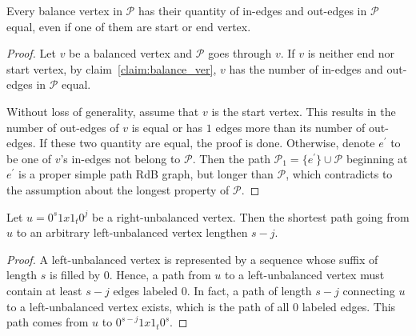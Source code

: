 \begin{claim}\label{claim:balance_ver}
    Every balance vertex in $\mathscr{P}$ has their quantity of in-edges and out-edges in $\mathscr{P}$ equal, even if one of them are start or end vertex.
\end{claim}
\begin{proof}
    Let $v$ be a balanced vertex and $\mathscr{P}$ goes through $v$. If $v$ is neither end nor start vertex, by claim~\ref{claim:balance_ver}, $v$ has the number of in-edges and out-edges in $\mathscr{P}$ equal. 
    
    Without loss of generality, assume that $v$ is the start vertex. This results in the number of out-edges of $v$ is equal or has $1$ edges more than its number of out-edges. If these two quantity are equal, the proof is done. Otherwise, denote $e^{\prime}$ to be one of $v$'s in-edges not belong to $\mathscr{P}$. Then the path $\mathscr{P}_{1} = \{e^{\prime}\}\cup\mathscr{P}$ beginning at $e^{\prime}$ is a proper simple path RdB graph, but longer than $\mathscr{P}$, which contradicts to the assumption about the longest property of $\mathscr{P}$.
\end{proof}
\begin{claim}\label{claim:shortes_right-left}
    Let $u=0^{s}1x1_{t}0^{j}$ be a right-unbalanced vertex. Then the shortest path going from $u$ to an arbitrary left-unbalanced vertex lengthen $s-j$.
\end{claim}
\begin{proof}
    A left-unbalanced vertex is represented by a sequence whose suffix of length $s$ is filled by $0$. Hence, a path from $u$ to a left-unbalanced vertex must contain at least $s-j$ edges labeled $0$. In fact, a path of length $s-j$ connecting $u$ to a left-unbalanced vertex exists, which is the path of all $0$ labeled edges. This path comes from $u$ to $0^{s-j}1x1_{t}0^{s}$.
\end{proof}
    

